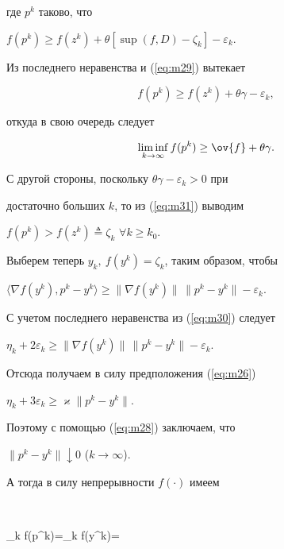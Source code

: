 где $p^{k}$ таково, что 


$f(p^{k})\geq f(z^{k})+\theta[\sup(f,D)-\zeta_{k}]-\varepsilon_{k}$.


Из последнего неравенства и (\ref{eq:m29}) вытекает


\begin{equation}


f(p^{k})\geq f(z^{k})+\theta \gamma -\varepsilon_{k},


\label{eq:m31}


\end{equation}


откуда в свою очередь следует


\begin{equation}


\liminf_{k \to \infty}f(p^{k})\geq \ov{f}+\theta \gamma.


\label{eq:m32}


\end{equation}





С другой стороны, поскольку $\theta \gamma -\varepsilon_{k} >0 $ при


достаточно больших $k$, то из (\ref{eq:m31}) выводим 


$f(p^{k})>f(z^{k})\triangleq\zeta_{k}$ $\forall k\geq k_{0}$.


Выберем теперь $y_{k},\:f(y^{k})=\zeta_{k}$, таким образом, чтобы 


$\langle \nabla f(y^{k}),p^{k}-y^{k} \rangle \geq


\| \nabla f(y^{k}) \|\, \|p^{k}-y^{k} \| -\varepsilon_{k}$.


С учетом последнего неравенства из (\ref{eq:m30}) следует


$\eta_{k}+2\varepsilon_{k} \geq 


\| \nabla f(y^{k}) \|\, \|p^{k}-y^{k} \| -\varepsilon_{k}$.


Отсюда получаем в силу предположения (\ref{eq:m26})


$\eta_{k}+3\varepsilon_{k} \geq \varkappa \|p^{k}-y^{k} \|$.


Поэтому с помощью (\ref{eq:m28}) заключаем, что 


$\|p^{k}-y^{k} \| \downarrow 0$ ($k \to \infty$).


А тогда в силу непрерывности $f(\cdot)$ имеем


$$


\lim_{k \to \infty}f(p^{k})=\lim_{k \to \infty}f(y^{k})=


